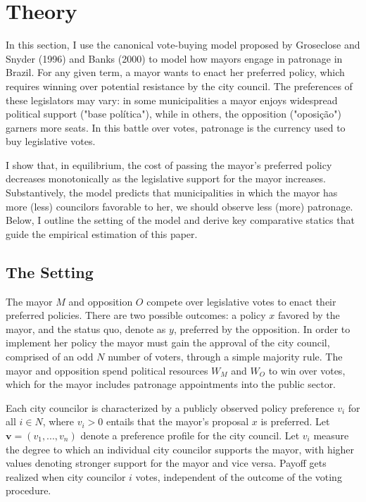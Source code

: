 \documentclass[12pt,a4paper]{article}
\begin{document}
\section*{Theory}

In this section, I use the canonical vote-buying model proposed by Groseclose and Snyder (1996) and Banks (2000) to model how mayors engage in patronage in Brazil. For any given term, a mayor wants to enact her preferred policy, which requires winning over potential resistance by the city council. The preferences of these legislators may vary: in some municipalities a mayor enjoys widespread political support ("base política"), while in others, the opposition ("oposição") garners more seats. In this battle over votes, patronage is the currency used to buy legislative votes.

I show that, in equilibrium, the cost of passing the mayor's preferred policy decreases monotonically as the legislative support for the mayor increases. Substantively, the model predicts that municipalities in which the mayor has more (less) councilors favorable to her, we should observe less (more) patronage. Below, I outline the setting of the model and derive key comparative statics that guide the empirical estimation of this paper.

\subsection*{The Setting}

The mayor $M$ and opposition $O$ compete over legislative votes to enact their preferred policies. There are two possible outcomes: a policy $x$ favored by the mayor, and the status quo, denote as $y$, preferred by the opposition. In order to implement her policy the mayor must gain the approval of the city council, comprised of an odd $N$ number of voters, through a simple majority rule. The mayor and opposition spend political resources $W_M$ and $W_O$ to win over votes, which for the mayor includes patronage appointments into the public sector.

Each city councilor is characterized by a publicly observed policy preference $v_i$ for all $i \in N$, where $v_i > 0$ entails that the mayor's proposal $x$ is preferred. Let $\mathbf{v} = (v_1, ..., v_n)$ denote a preference profile for the city council. Let $v_i$ measure the degree to which an individual city councilor supports the mayor, with higher values denoting stronger support for the mayor and vice versa. Payoff gets realized when city councilor $i$ votes, independent of the outcome of the voting procedure.
\end{document}

